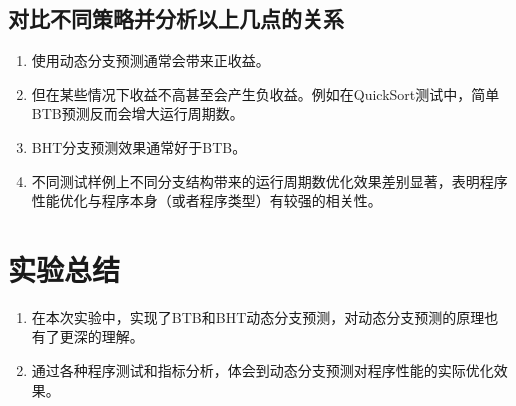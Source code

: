 \documentclass[UTF8]{article}
\begin{document}
    \subsection{对比不同策略并分析以上几点的关系}
    \begin{enumerate}
        \item 使用动态分支预测通常会带来正收益。
        \item 但在某些情况下收益不高甚至会产生负收益。例如在QuickSort测试中，简单BTB预测反而会增大运行周期数。
        \item BHT分支预测效果通常好于BTB。
        \item 不同测试样例上不同分支结构带来的运行周期数优化效果差别显著，表明程序性能优化与程序本身（或者程序类型）有较强的相关性。
    \end{enumerate}
    \section{实验总结}
    \begin{enumerate}
        \item 在本次实验中，实现了BTB和BHT动态分支预测，对动态分支预测的原理也有了更深的理解。
        \item 通过各种程序测试和指标分析，体会到动态分支预测对程序性能的实际优化效果。
    \end{enumerate}
\end{document}
